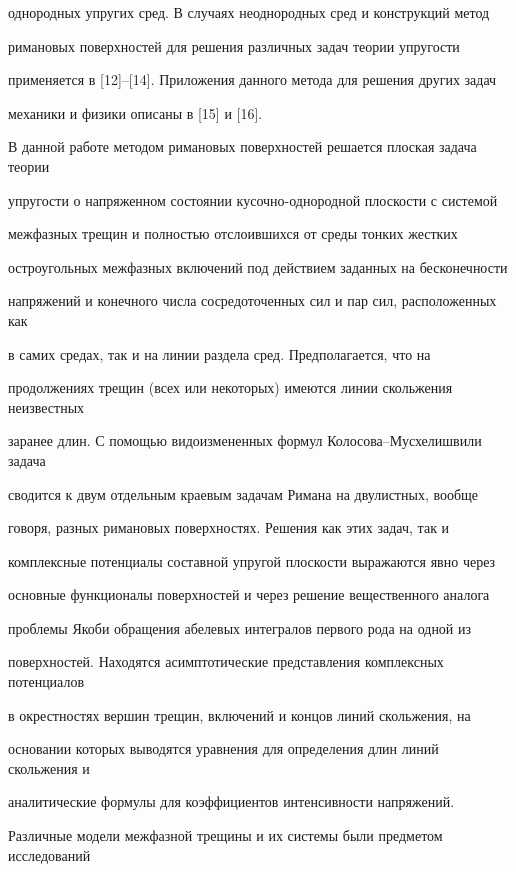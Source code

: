 однородных упругих сред. В случаях неоднородных сред и конструкций метод 


римановых поверхностей для решения различных задач теории упругости 


применяется в [12]--[14]. Приложения данного метода для решения других задач 


механики и физики описаны в [15] и [16]. 


 


В данной работе методом римановых поверхностей решается плоская задача теории 


упругости о напряженном состоянии кусочно-однородной плоскости с системой 


межфазных трещин и полностью отслоившихся от среды тонких жестких 


остроугольных межфазных включений под действием заданных на бесконечности 


напряжений и конечного числа сосредоточенных сил и пар сил, расположенных как 


в самих средах, так и на линии раздела сред. Предполагается, что на 


продолжениях трещин (всех или некоторых) имеются линии скольжения неизвестных 


заранее длин. С помощью видоизмененных формул Колосова--Мусхелишвили задача 


сводится к двум отдельным краевым задачам Римана на двулистных, вообще 


говоря, разных римановых поверхностях. Решения как этих задач, так и 


комплексные потенциалы составной упругой плоскости выражаются явно через 


основные функционалы поверхностей и через решение вещественного аналога 


проблемы Якоби обращения абелевых интегралов первого рода на одной из 


поверхностей. Находятся асимптотические представления комплексных потенциалов 


в окрестностях вершин трещин, включений и концов линий скольжения, на 


основании которых выводятся уравнения для определения длин линий скольжения и 


аналитические формулы для коэффициентов интенсивности напряжений. 


 


Различные модели межфазной трещины и их системы были предметом исследований 


